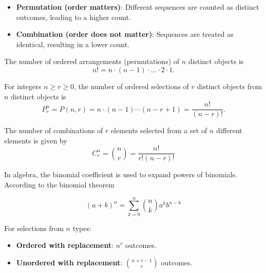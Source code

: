 \begin{definition}
    \begin{itemize}
        \item \textbf{Permutation (order matters)}: Different sequences are counted as distinct outcomes, leading to a higher count.
        \item \textbf{Combination (order does not matter)}: Sequences are treated as identical, resulting in a lower count.
    \end{itemize}
\end{definition}

\begin{proposition}
    The number of ordered arrangements (permutations) of $n$ distinct objects is
    \[
    n! = n \cdot (n-1) \cdot \dots \cdot 2 \cdot 1.
    \]
\end{proposition}

\begin{theorem}
    For integers $n \ge r \ge 0$, the number of ordered selections of $r$ distinct objects from $n$ distinct objects is
    \[
    P_r^n = P(n,r) = n \cdot (n-1) \cdots (n-r+1) = \frac{n!}{(n-r)!}.
    \]
\end{theorem}

\begin{theorem}[Combinations]
    The number of combinations of $r$ elements selected from a set of $n$ different elements is given by
    \[
    C_r^n = \binom{n}{r} = \frac{n!}{r!(n-r)!}
    \]
\end{theorem}

\begin{theorem}
    In algebra, the binomial coefficient is used to expand powers of binomials. According to the binomial theorem

$$
(a+b)^n=\sum_{k=0}^n\binom{n}{k} a^k b^{n-k}
$$

\end{theorem}

\begin{proposition}
For selections from $n$ types:
\begin{itemize}
    \item \textbf{Ordered with replacement}: $n^r$ outcomes.
    \item \textbf{Unordered with replacement}: $\displaystyle \binom{n+r-1}{r}$ outcomes. %
\end{itemize}
\end{proposition}

